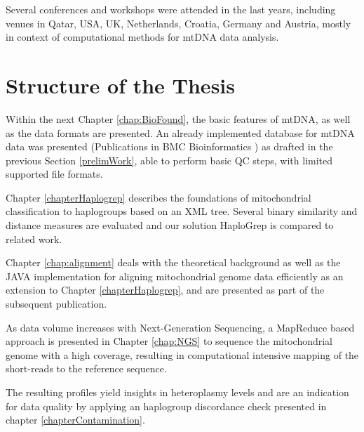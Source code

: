 Several conferences and workshops were attended in the last years, including venues in Qatar, USA, UK, Netherlands, Croatia, Germany and Austria, mostly in context of computational methods for mtDNA data analysis. 

\section{Structure of the Thesis}
\label{sect:ProblChar}
Within the next Chapter \ref{chap:BioFound}, the basic features of mtDNA, as well as the data formats are presented. An already implemented database for mtDNA data was presented (Publications in BMC Bioinformatics \cite{Schoenherr2009, Weissensteiner2010}) as drafted in the previous Section \ref{prelimWork}, able to perform basic QC steps, with limited supported file formats.

Chapter \ref{chapterHaplogrep} describes the foundations of mitochondrial classification to haplogroups based on an XML tree. Several binary similarity and distance measures are evaluated and our solution HaploGrep is compared to related work. 


Chapter \ref{chap:alignment} deals with the theoretical background as well as the JAVA implementation for aligning mitochondrial genome data efficiently as an extension to Chapter \ref{chapterHaplogrep}, and are presented as part of the subsequent publication. 

As data volume increases with Next-Generation Sequencing, a MapReduce based approach is presented in Chapter \ref{chap:NGS} to sequence the mitochondrial genome with a high coverage, resulting in computational intensive mapping of the short-reads to the reference sequence. 

The resulting profiles yield insights in heteroplasmy levels and are an indication for data quality by applying an haplogroup discordance check presented in chapter \ref{chapterContamination}.


